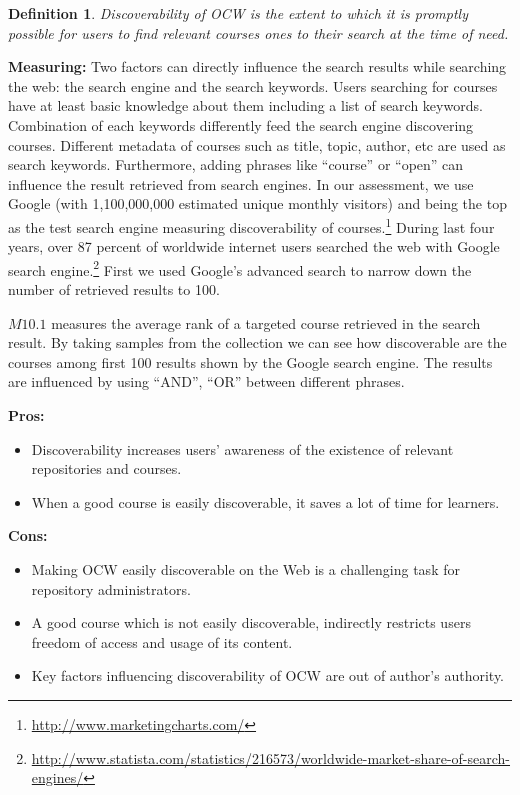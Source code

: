 \documentclass{sig-alternate}
\theoremstyle{definition}
\newtheorem{defn}{Definition}
\begin{document}
\begin{defn}
\emph {Discoverability of OCW is the extent to which it is promptly possible for users to find relevant courses ones to their search at the time of need.}
\end{defn}

\noindent\textbf{Measuring:}
Two factors can directly influence the search results while searching the web: the search engine and the search keywords.
Users searching for courses have at least basic knowledge about them including a list of search keywords.
Combination of each keywords differently feed the search engine discovering courses.
Different metadata of courses such as title, topic, author, etc are used as search keywords.
Furthermore, adding phrases like ``course'' or ``open'' can influence the result retrieved from search engines.
In our assessment, we use Google (with 1,100,000,000 estimated unique monthly visitors) and being the top as the test search engine measuring discoverability of courses.\footnote{\url{http://www.marketingcharts.com/}}
During last four years, over 87 percent of worldwide internet users searched the web with Google search engine.\footnote{\url{http://www.statista.com/statistics/216573/worldwide-market-share-of-search-engines/}}
First we used Google's advanced search to narrow down the number of retrieved results to 100.

$M10.1$ measures the average rank of a targeted course retrieved in the search result.
By taking samples from the collection we can see how discoverable are the courses among first 100 results shown by the Google search engine.
The results are influenced by using ``AND'', ``OR'' between different phrases.

\noindent\textbf{Pros:}
\begin{itemize}
\item Discoverability increases users' awareness of the existence of relevant repositories and courses.
\item When a good course is easily discoverable, it saves a lot of time for learners.
\end{itemize}
\noindent\textbf{Cons:}
\begin{itemize}
\item Making OCW easily discoverable on the Web is a challenging task for repository administrators.
\item A good course which is not easily discoverable, indirectly restricts users freedom of access and usage of its content.
\item Key factors influencing discoverability of OCW are out of author's authority.
\end{itemize}
\end{document}
